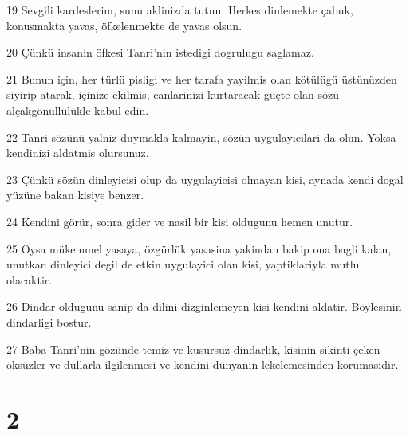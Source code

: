 \par 19 Sevgili kardeslerim, sunu aklinizda tutun: Herkes dinlemekte çabuk, konusmakta yavas, öfkelenmekte de yavas olsun.
\par 20 Çünkü insanin öfkesi Tanri'nin istedigi dogrulugu saglamaz.
\par 21 Bunun için, her türlü pisligi ve her tarafa yayilmis olan kötülügü üstünüzden siyirip atarak, içinize ekilmis, canlarinizi kurtaracak güçte olan sözü alçakgönüllülükle kabul edin.
\par 22 Tanri sözünü yalniz duymakla kalmayin, sözün uygulayicilari da olun. Yoksa kendinizi aldatmis olursunuz.
\par 23 Çünkü sözün dinleyicisi olup da uygulayicisi olmayan kisi, aynada kendi dogal yüzüne bakan kisiye benzer.
\par 24 Kendini görür, sonra gider ve nasil bir kisi oldugunu hemen unutur.
\par 25 Oysa mükemmel yasaya, özgürlük yasasina yakindan bakip ona bagli kalan, unutkan dinleyici degil de etkin uygulayici olan kisi, yaptiklariyla mutlu olacaktir.
\par 26 Dindar oldugunu sanip da dilini dizginlemeyen kisi kendini aldatir. Böylesinin dindarligi bostur.
\par 27 Baba Tanri'nin gözünde temiz ve kusursuz dindarlik, kisinin sikinti çeken öksüzler ve dullarla ilgilenmesi ve kendini dünyanin lekelemesinden korumasidir.

\chapter{2}

